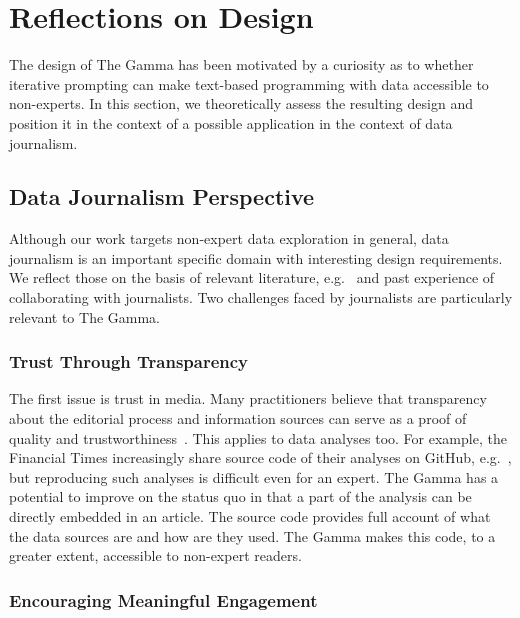 \documentclass[manuscript,review,anonymous]{acmart}
\begin{document}

\section{Reflections on Design}
\label{sec:design}

The design of The Gamma has been motivated by a curiosity as to whether iterative
prompting can make text-based programming with data accessible to non-experts. In this section,
we theoretically assess the resulting design and position it in the context of a possible application
in the context of data journalism.

\subsection{Data Journalism Perspective}
\label{sec:design-ddj}

Although our work targets non-expert data exploration in general, data journalism is an important
specific domain with interesting design requirements. We reflect those on the basis of relevant
literature, e.g.~\cite{ddj,edcj17,edcj18} and past experience of collaborating with
journalists. Two challenges faced by journalists \cite{future} are particularly relevant to The Gamma.

\subsubsection*{Trust Through Transparency}
The first issue is trust in media. Many practitioners believe that transparency
about the editorial process and information sources can serve as a proof of quality and
trustworthiness~\cite{transparency}. This applies to data analyses too. For example, the Financial Times
increasingly share source code of their analyses on GitHub, e.g.~\cite{ftnotebooks},
but reproducing such analyses is difficult even for an expert. The Gamma has a potential to
improve on the status quo in that a part of the analysis can be directly embedded in an article.
The source code provides full account of what the data sources are and how are they used.
The Gamma makes this code, to a greater extent, accessible to non-expert readers.

\subsubsection*{Encouraging Meaningful Engagement}
\end{document}
